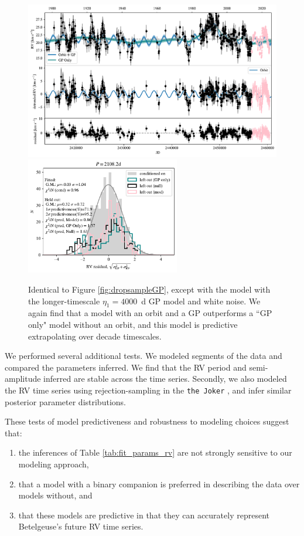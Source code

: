 \documentclass[twocolumn]{aastex631}
\begin{document}
\begin{figure}[p]
    \centering
    \includegraphics[width=\textwidth]{figures/drop_predict_rvtime_jit.pdf}
    \includegraphics[width=0.6\textwidth]{figures/drop_predict_residual_histogram_jit.pdf}
    \caption{Identical to Figure \ref{fig:dropsampleGP}, except with the model with the longer-timescale $\eta_1 = 4000$~d GP model and white noise.  We again find that a model with an orbit and a GP outperforms a ``GP only" model without an orbit, and this model is predictive extrapolating over decade timescales.  }
    \label{fig:dropsampleJIT}
\end{figure}

We performed several additional tests. We modeled segments of the data and compared the parameters inferred. We find that the RV period and semi-amplitude inferred are stable across the time series. Secondly, we also modeled the RV time series using rejection-sampling in the {\tt the Joker} \citep{2017ApJ...837...20P}, and infer similar posterior parameter distributions.


These tests of model predictiveness and robustness to modeling choices suggest that:
\begin{enumerate}
    \item the inferences of Table \ref{tab:fit_params_rv} are not strongly sensitive to our modeling approach,
    \item that a model with a binary companion is preferred in describing the data over models without, and 
    \item that these models are predictive in that they can accurately represent  Betelgeuse's future RV time series. 
\end{enumerate} 
\end{document}
